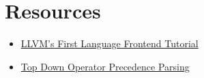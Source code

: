 \chapter{Resources}

\begin{itemize}
  \item \href{https://llvm.org/docs/tutorial/MyFirstLanguageFrontend/index.html}
  {LLVM's First Language Frontend Tutorial}
  \item \href{https://eli.thegreenplace.net/2010/01/02/top-down-operator-precedence-parsing}
  {Top Down Operator Precedence Parsing}
\end{itemize}
